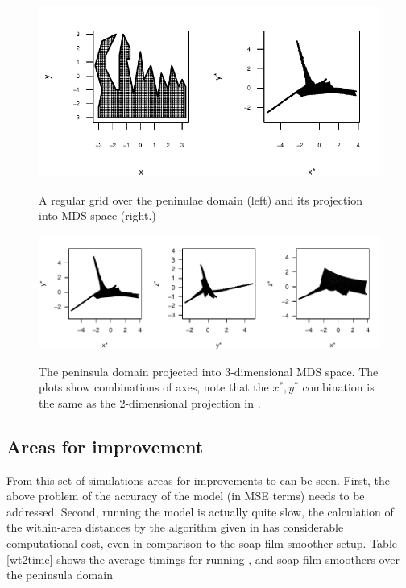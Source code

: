 \begin{figure}
\centering
\includegraphics[width=4.5in]{mds/figs/wt2-2d-proj.pdf} \\
\caption{A regular grid over the peninulae domain (left) and its projection into MDS space (right.)}
\label{wt2-2d-proj}
\end{figure}

\begin{figure}
\centering
\includegraphics[width=6in]{mds/figs/wt2-3d-proj.pdf} \\
\caption{The peninsula domain projected into 3-dimensional MDS space. The plots show combinations of axes, note that the $x^*,y^*$ combination is the same as the 2-dimensional projection in .}
\label{wt2-3d-proj}
\end{figure}

\subsection{Areas for improvement}

From this set of simulations areas for improvements to \mdsap can be seen. First, the above problem of the accuracy of the model (in MSE terms) needs to be addressed. Second, running the model is actually quite slow, the calculation of the within-area distances by the algorithm given in  has considerable computational cost, even in comparison to the soap film smoother setup. Table \ref{wt2time} shows the average timings for running \mdsap, \tprs and soap film smoothers over the peninsula domain

